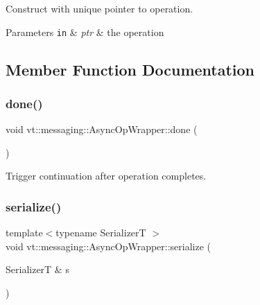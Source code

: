Construct with unique pointer to operation. 


\begin{DoxyParams}[1]{Parameters}
\mbox{\tt in}  & {\em ptr} & the operation \\
\hline
\end{DoxyParams}


\subsection{Member Function Documentation}
\mbox{\label{structvt_1_1messaging_1_1_async_op_wrapper_afe1b0def9a79849baa18373787440714}} 
\subsubsection{\texorpdfstring{done()}{done()}}
{\footnotesize\ttfamily void vt\+::messaging\+::\+Async\+Op\+Wrapper\+::done (\begin{DoxyParamCaption}{ }\end{DoxyParamCaption})\hspace{0.3cm}{\ttfamily [inline]}}



Trigger continuation after operation completes. 

\mbox{\label{structvt_1_1messaging_1_1_async_op_wrapper_a219a6d0d317bd75c0d559dbb91838166}} 
\subsubsection{\texorpdfstring{serialize()}{serialize()}}
{\footnotesize\ttfamily template$<$typename SerializerT $>$ \\
void vt\+::messaging\+::\+Async\+Op\+Wrapper\+::serialize (\begin{DoxyParamCaption}\item[{SerializerT \&}]{s }\end{DoxyParamCaption})\hspace{0.3cm}{\ttfamily [inline]}}



